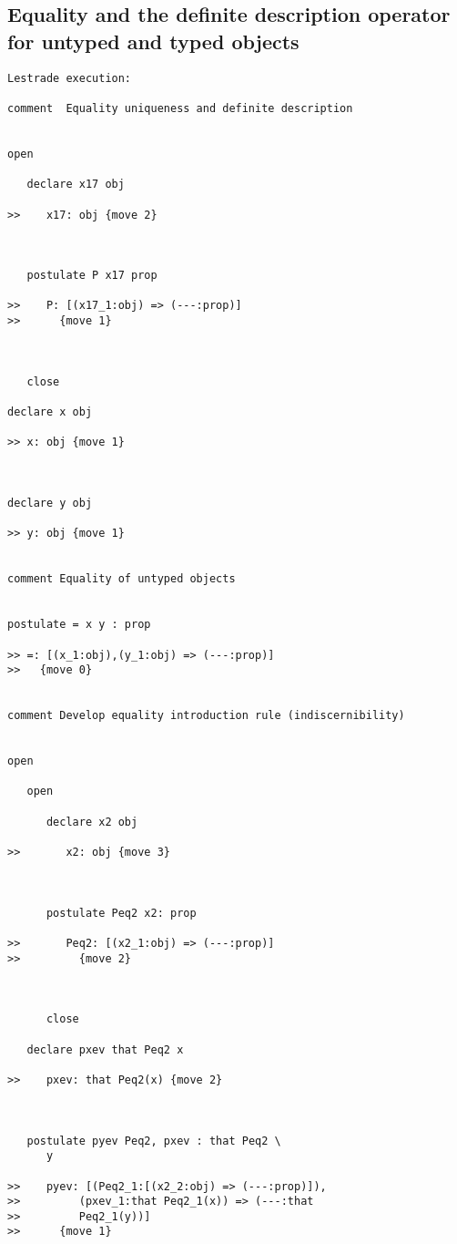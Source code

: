 \documentclass[12pt]{article}
\begin{document}
\subsection{Equality and the definite description operator for untyped and typed objects}


\begin{verbatim}Lestrade execution:

comment  Equality uniqueness and definite description


open

   declare x17 obj

>>    x17: obj {move 2}



   postulate P x17 prop

>>    P: [(x17_1:obj) => (---:prop)]
>>      {move 1}



   close

declare x obj

>> x: obj {move 1}



declare y obj

>> y: obj {move 1}


comment Equality of untyped objects


postulate = x y : prop

>> =: [(x_1:obj),(y_1:obj) => (---:prop)]
>>   {move 0}


comment Develop equality introduction rule (indiscernibility)


open

   open

      declare x2 obj

>>       x2: obj {move 3}



      postulate Peq2 x2: prop

>>       Peq2: [(x2_1:obj) => (---:prop)]
>>         {move 2}



      close

   declare pxev that Peq2 x

>>    pxev: that Peq2(x) {move 2}



   postulate pyev Peq2, pxev : that Peq2 \
      y

>>    pyev: [(Peq2_1:[(x2_2:obj) => (---:prop)]),
>>         (pxev_1:that Peq2_1(x)) => (---:that
>>         Peq2_1(y))]
>>      {move 1}




\end{verbatim}
\end{document}
